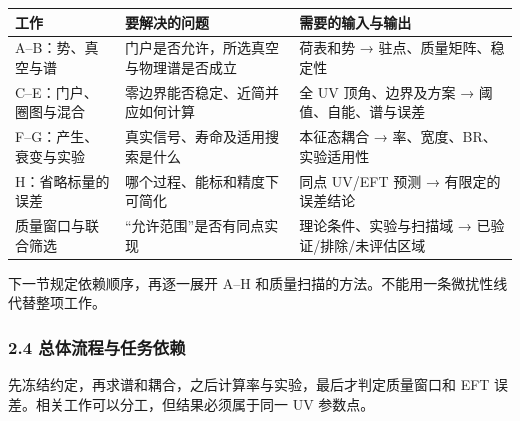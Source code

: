 \documentclass[
  chinese,
  UTF8]{ctexart}
\newcounter{none} %
\begin{document}
{\def\LTcaptype{none} %
\begin{longtable}[]{@{}
  >{\raggedright\arraybackslash}p{}
  >{\raggedright\arraybackslash}p{}
  >{\raggedright\arraybackslash}p{}@{}}
\toprule\noalign{}
\begin{minipage}[b]{\linewidth}\raggedright
工作
\end{minipage} & \begin{minipage}[b]{\linewidth}\raggedright
要解决的问题
\end{minipage} & \begin{minipage}[b]{\linewidth}\raggedright
需要的输入与输出
\end{minipage} \\
\midrule\noalign{}
\endhead
\bottomrule\noalign{}
\endlastfoot
A--B：势、真空与谱 & 门户是否允许，所选真空与物理谱是否成立 & 荷表和势 →
驻点、质量矩阵、稳定性 \\
C--E：门户、圈图与混合 & 零边界能否稳定、近简并应如何计算 & 全 UV
顶角、边界及方案 → 阈值、自能、谱与误差 \\
F--G：产生、衰变与实验 & 真实信号、寿命及适用搜索是什么 & 本征态耦合 →
率、宽度、BR、实验适用性 \\
H：省略标量的误差 & 哪个过程、能标和精度下可简化 & 同点 UV/EFT 预测 →
有限定的误差结论 \\
质量窗口与联合筛选 & ``允许范围''是否有同点实现 & 理论条件、实验与扫描域
→ 已验证/排除/未评估区域 \\
\end{longtable}
}

下一节规定依赖顺序，再逐一展开 A--H
和质量扫描的方法。不能用一条微扰性线代替整项工作。

\subsubsection{2.4 总体流程与任务依赖}\label{major-1-step-4}

先冻结约定，再求谱和耦合，之后计算率与实验，最后才判定质量窗口和 EFT
误差。相关工作可以分工，但结果必须属于同一 UV 参数点。
\end{document}
